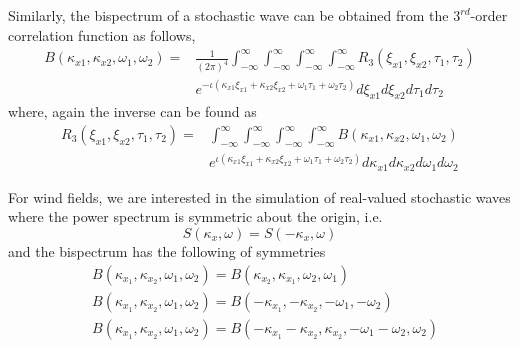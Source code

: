 \documentclass[preprint, review, 12pt]{elsarticle}
\begin{document}
Similarly, the bispectrum of a stochastic wave can be obtained from the $3^{rd}$-order correlation function as follows,
\begin{equation}
\begin{aligned}
	B(\kappa_{x1}, \kappa_{x2}, \omega_{1}, \omega_{2}) = & \frac{1}{(2\pi)^4}\int_{-\infty}^{\infty}\int_{-\infty}^{\infty}\int_{-\infty}^{\infty}\int_{-\infty}^{\infty}R_{3}(\xi_{x1}, \xi_{x2}, \tau_{1}, \tau_{2})\\
	& e^{-\iota(\kappa_{x1}\xi_{x1} + \kappa_{x2}\xi_{x2} + \omega_{1}\tau_{1} + \omega_{2}\tau_{2})} d\xi_{x1}d\xi_{x2}d\tau_{1}d\tau_{2}
	\label{eqn:third_order_forward_weiner_khintchine}
\end{aligned}
\end{equation}
where, again the inverse can be found as
\begin{equation}
\begin{aligned}
	R_{3}(\xi_{x1}, \xi_{x2}, \tau_{1}, \tau_{2}) = & \int_{-\infty}^{\infty}\int_{-\infty}^{\infty}\int_{-\infty}^{\infty}\int_{-\infty}^{\infty}B(\kappa_{x1}, \kappa_{x2}, \omega_{1}, \omega_{2})\\
	& e^{\iota(\kappa_{x1}\xi_{x1} + \kappa_{x2}\xi_{x2} + \omega_{1}\tau_{1} + \omega_{2}\tau_{2})} d\kappa_{x1}d\kappa_{x2}d\omega_{1}d\omega_{2}
	\label{eqn:third_order_inverse_weiner_khintchine}
\end{aligned}
\end{equation}

For wind fields, we are interested in the simulation of real-valued stochastic waves where the power spectrum is symmetric about the origin, i.e.
\begin{equation}
    S(\kappa_x, \omega) = S(-\kappa_x, \omega)
\end{equation}
and the bispectrum has the following of symmetries \cite{Shields2017}
\begin{equation}
\begin{aligned}
    & B(\kappa_{x_1}, \kappa_{x_2}, \omega_1, \omega_2) = B(\kappa_{x_2}, \kappa_{x_1}, \omega_2, \omega_1) \\
    & B(\kappa_{x_1}, \kappa_{x_2}, \omega_1, \omega_2) = B(-\kappa_{x_1}, -\kappa_{x_2}, -\omega_1, -\omega_2) \\
    & B(\kappa_{x_1}, \kappa_{x_2}, \omega_1, \omega_2) = B(-\kappa_{x_1} -\kappa_{x_2}, \kappa_{x_2}, -\omega_1 -\omega_2, \omega_2)
\end{aligned}
\end{equation}
\end{document}
